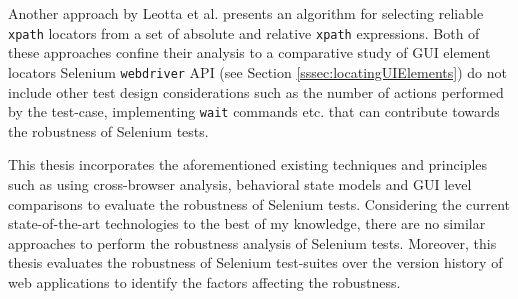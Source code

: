 Another approach by Leotta et al. presents an algorithm for selecting reliable \texttt{xpath} locators from a set of absolute and relative \texttt{xpath} expressions. 
Both of these approaches confine their analysis to a comparative study of GUI element locators Selenium \texttt{webdriver} API (see Section \ref{sssec:locatingUIElements}) do not include other test design considerations such as the number of actions performed by the test-case, implementing \texttt{wait} commands etc. that can contribute towards the robustness of Selenium tests. 

This thesis incorporates the aforementioned existing techniques and principles such as using cross-browser analysis, behavioral state models and GUI level comparisons to evaluate the robustness of Selenium tests. Considering the current state-of-the-art technologies to the best of my knowledge, there are no similar approaches to perform the robustness analysis of Selenium tests. Moreover, this thesis evaluates the robustness of Selenium test-suites over the version history of web applications to identify the factors affecting the robustness. 

